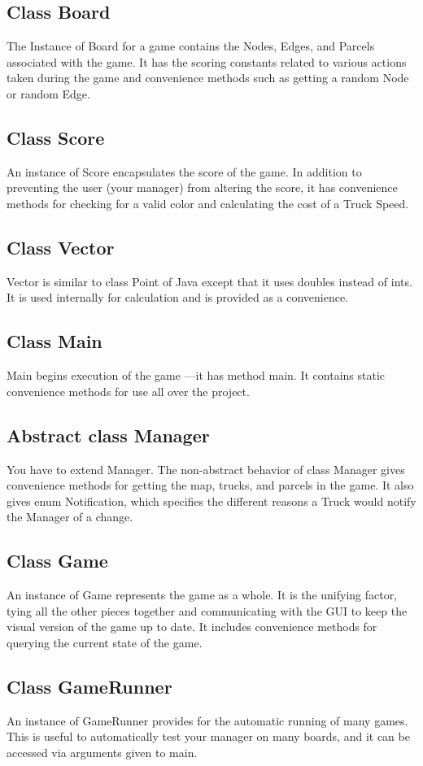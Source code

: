 \documentclass[11pt]{article}
\begin{document}
\subsection{Class Board}
The Instance of Board for a game contains the Nodes, Edges, and Parcels associated with the game. It has the scoring constants related to various actions taken during the game and convenience methods such as getting a random Node or random Edge.
\subsection{Class Score}
An instance of Score encapsulates the score of the game. In addition to preventing the user (your manager) from altering the score, it has convenience methods for checking for a valid color and calculating the cost of a Truck Speed.
\subsection{Class Vector}
Vector is  similar to class Point of Java except that it uses doubles instead of ints. It is used internally for calculation and is provided as a convenience.
\subsection{Class Main}
Main begins execution of the game —it has method main. It contains static convenience methods for use all over the project.
\subsection{Abstract class Manager}
You have to extend Manager. The non-abstract behavior of class Manager gives convenience methods for getting the map, trucks, and parcels in the game. It also gives enum Notification, which specifies the different reasons a Truck would notify the Manager of a change.
\subsection{Class Game}
An instance of Game represents the game as a whole. It is the unifying factor, tying all  the other pieces together and communicating with the GUI to keep the visual version of the game up to date. It includes convenience methods for querying the current state of the game.
\subsection{Class GameRunner}
An instance of GameRunner provides for the automatic running of many games. This is useful to automatically test your manager on many boards, and it can be accessed via arguments given to main.
\end{document}
